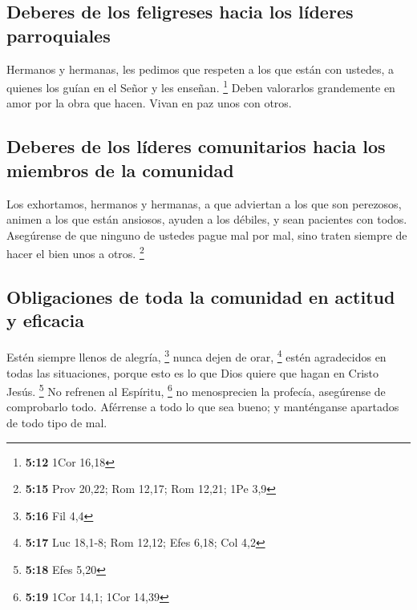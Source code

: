 \hypertarget{deberes-de-los-feligreses-hacia-los-luxedderes-parroquiales}{%
\subsection{Deberes de los feligreses hacia los líderes
parroquiales}\label{deberes-de-los-feligreses-hacia-los-luxedderes-parroquiales}}

 Hermanos y hermanas, les pedimos que respeten a los que
están con ustedes, a quienes los guían en el Señor y les enseñan.
\footnote{\textbf{5:12} 1Cor 16,18}  Deben valorarlos
grandemente en amor por la obra que hacen. Vivan en paz unos con otros.

\hypertarget{deberes-de-los-luxedderes-comunitarios-hacia-los-miembros-de-la-comunidad}{%
\subsection{Deberes de los líderes comunitarios hacia los miembros de la
comunidad}\label{deberes-de-los-luxedderes-comunitarios-hacia-los-miembros-de-la-comunidad}}

 Los exhortamos, hermanos y hermanas, a que adviertan a
los que son perezosos, animen a los que están ansiosos, ayuden a los
débiles, y sean pacientes con todos.  Asegúrense de que
ninguno de ustedes pague mal por mal, sino traten siempre de hacer el
bien unos a otros. \footnote{\textbf{5:15} Prov 20,22; Rom 12,17; Rom
  12,21; 1Pe 3,9}

\hypertarget{obligaciones-de-toda-la-comunidad-en-actitud-y-eficacia}{%
\subsection{Obligaciones de toda la comunidad en actitud y
eficacia}\label{obligaciones-de-toda-la-comunidad-en-actitud-y-eficacia}}

 Estén siempre llenos de alegría, \footnote{\textbf{5:16}
  Fil 4,4}  nunca dejen de orar, \footnote{\textbf{5:17}
  Luc 18,1-8; Rom 12,12; Efes 6,18; Col 4,2}  estén
agradecidos en todas las situaciones, porque esto es lo que Dios quiere
que hagan en Cristo Jesús. \footnote{\textbf{5:18} Efes 5,20}
 No refrenen al Espíritu, \footnote{\textbf{5:19} 1Cor
  14,1; 1Cor 14,39}  no menosprecien la profecía,
 asegúrense de comprobarlo todo. Aférrense a todo lo que
sea bueno;  y manténganse apartados de todo tipo de mal.

